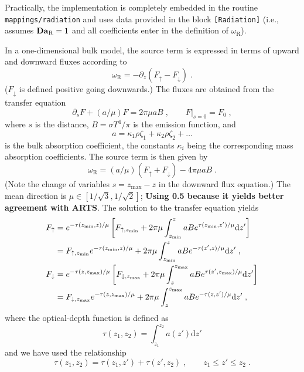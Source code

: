 Practically, the implementation is completely embedded in the routine {\tt mappings/radiation} and uses data provided in the block \texttt{[Radiation]} (i.e., assumes $\mathrm{\bf Da}_\mathrm{R}=1$ and all coefficients enter in the definition of $\omega_\mathrm{R}$). 

In a one-dimensional bulk model, the source term is expressed in terms of upward and downward fluxes according to
\begin{equation}
    \omega_\mathrm{R}=-\partial_z(F_\uparrow -F_\downarrow) \;.
\end{equation}
($F_\downarrow$ is defined positive going downwards.) The fluxes are obtained from the transfer equation
\begin{equation}
    \partial_s F+(a/\mu) F = 2\pi\mu a B\;,\qquad F|_{s=0}=F_0 \;,
\end{equation}
where $s$ is the distance, $B=\sigma T^4/\pi$ is the emission function, and 
\begin{equation}
    a = \kappa_1 \rho \zeta_1 + \kappa_2 \rho \zeta_2 + \ldots
\end{equation}
is the bulk absorption coefficient, the constants $\kappa_i$ being the corresponding mass absorption coefficients. The source term is then given by
\begin{equation}
    \omega_\mathrm{R}=(a/\mu) (F_\uparrow +F_\downarrow) - 4\pi\mu a B \;.
\end{equation}
(Note the change of variables $s=z_\mathrm{max}-z$ in the downward flux equation.) The mean direction is $\mu\in[1/\sqrt{3},1/\sqrt{2}]$; \textbf{Using 0.5 because it yields better agreement with ARTS}. The solution to the transfer equation yields
\begin{subequations}
    \begin{align}
        F_\uparrow &= e^{-\tau(z_\mathrm{min},z)/\mu}\left[ F_{\uparrow,z_\mathrm{min}} + 2\pi\mu\int_{z_\mathrm{min}}^z a B e^{\tau(z_\mathrm{min},z')/\mu}\mathrm{d}z'\right]\notag \\
        &= F_{\uparrow,z_\mathrm{min}}e^{-\tau(z_\mathrm{min},z)/\mu}+ 2\pi\mu\int_{z_\mathrm{min}}^z a B e^{-\tau(z',z)/\mu}\mathrm{d}z' \;,\\
        F_\downarrow &= e^{-\tau(z,z_\mathrm{max})/\mu}\left[ F_{\downarrow,z_\mathrm{max}} + 2\pi\mu\int_z^{z_\mathrm{max}} a B e^{\tau(z',z_\mathrm{max})/\mu}\mathrm{d}z'\right]\notag \\
        &=F_{\downarrow,z_\mathrm{max}}e^{-\tau(z,z_\mathrm{max})/\mu} + 2\pi\mu\int_z^{z_\mathrm{max}} a B e^{-\tau(z,z')/\mu}\mathrm{d}z'\;,
    \end{align}
\end{subequations}
where the optical-depth function is defined as
\begin{equation}
    \tau(z_1, z_2) = \int_{z_1}^{z_2}a(z')\mathrm{d} z'
\end{equation}
and we have used the relationship
\begin{equation}
    \tau(z_1, z_2) = \tau(z_1, z') + \tau(z', z_2)\;,\qquad z_1\le z'\le z_2 \;.
\end{equation}

